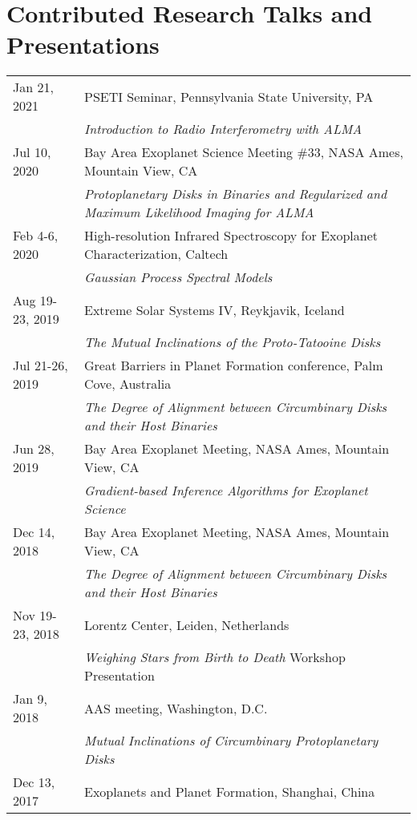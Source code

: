 \section*{Contributed Research Talks and Presentations}
\setlength\LTleft{0pt}
\setlength\LTright{0pt}
\begin{longtable}{@{\hspace{10pt}}p{1.2in}l}
  Jan 21, 2021 & PSETI Seminar, Pennsylvania State University, PA \\
  & \emph{Introduction to Radio Interferometry with ALMA}\\[\rowskip]
  Jul 10, 2020 & Bay Area Exoplanet Science Meeting \#33, NASA Ames, Mountain View, CA \\
  & \emph{Protoplanetary Disks in Binaries and Regularized and Maximum Likelihood Imaging for ALMA} \\
  Feb 4-6, 2020 & High-resolution Infrared Spectroscopy for Exoplanet Characterization, Caltech \\
  & \emph{Gaussian Process Spectral Models} \\[\rowskip]
  Aug 19-23, 2019 & Extreme Solar Systems IV, Reykjavik, Iceland\\ 
  & \emph{The Mutual Inclinations of the Proto-Tatooine Disks} \\[\rowskip]
  Jul 21-26, 2019 & Great Barriers in Planet Formation conference, Palm Cove, Australia\\
  & \emph{The Degree of Alignment between Circumbinary Disks and their Host Binaries} \\[\rowskip]
  Jun 28, 2019 & Bay Area Exoplanet Meeting, NASA Ames, Mountain View, CA\\
  & \emph{Gradient-based Inference Algorithms for Exoplanet Science} \\[\rowskip]
  Dec 14, 2018 & Bay Area Exoplanet Meeting, NASA Ames, Mountain View, CA\\
  & \emph{The Degree of Alignment between Circumbinary Disks and their Host Binaries} \\[\rowskip]
  Nov 19-23, 2018 & Lorentz Center, Leiden, Netherlands\\
  & \emph{Weighing Stars from Birth to Death} Workshop Presentation \\[\rowskip]
  Jan 9, 2018 & AAS meeting, Washington, D.C. \\
  & \emph{Mutual Inclinations of Circumbinary Protoplanetary Disks} \\[\rowskip]
  Dec 13, 2017 & Exoplanets and Planet Formation, Shanghai, China \\

\end{longtable}
